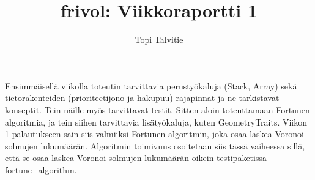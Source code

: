 \documentclass[a4paper, 11pt, finnish]{article}
\author{Topi Talvitie}
\title{frivol: Viikkoraportti 1}
\begin{document}
\maketitle

Ensimmäisellä viikolla toteutin tarvittavia perustyökaluja (Stack, Array) sekä tietorakenteiden (prioriteetijono ja hakupuu) rajapinnat ja ne tarkistavat konseptit. Tein näille myös tarvittavat testit. Sitten aloin toteuttamaan Fortunen algoritmia, ja tein siihen tarvittavia lisätyökaluja, kuten GeometryTraits. Viikon 1 palautukseen sain siis valmiiksi Fortunen algoritmin, joka osaa laskea Voronoi-solmujen lukumäärän. Algoritmin toimivuus osoitetaan siis tässä vaiheessa sillä, että se osaa laskea Voronoi-solmujen lukumäärän oikein testipaketissa fortune\_algorithm.
\end{document}
